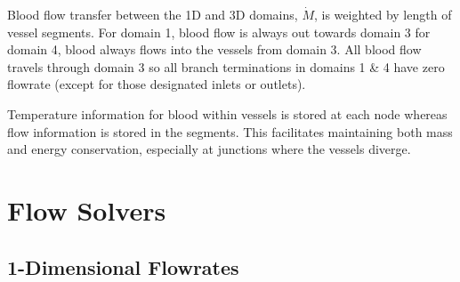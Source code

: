 \documentclass[11pt,english,a4paper,twoside,openright]{report}
\begin{document}
{{{{{{{{Blood flow transfer between the 1D and 3D domains, $\dot{M}$, is weighted by length of vessel segments. For domain 1, blood flow is always out towards domain 3 for domain 4, blood always flows into the vessels from domain 3. All blood flow travels through domain 3 so all branch terminations in domains 1 \& 4 have zero flowrate (except for those designated inlets or outlets).

Temperature information for blood within vessels is stored at each node whereas flow information is stored in the segments. This facilitates maintaining both mass and energy conservation, especially at junctions where the vessels diverge.  

\section[Flow Solvers]{{\Large F}low {\Large S}olvers}
\subsection{1-Dimensional Flowrates}
\label{Sec:3Flowrates1d}

}}}}}}}}
\end{document}
